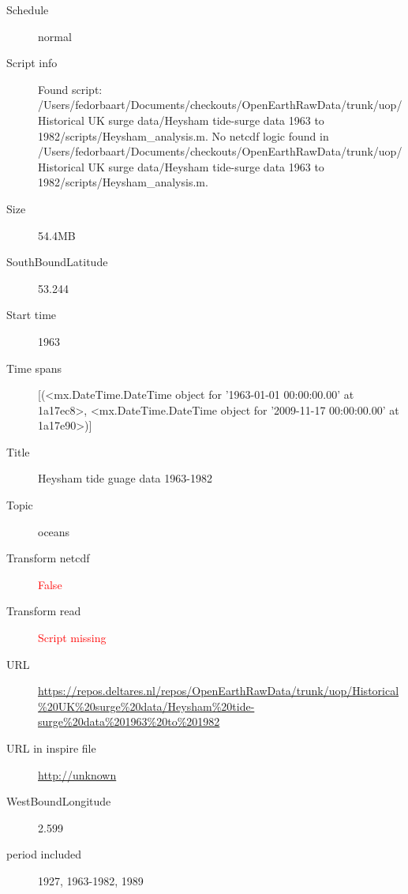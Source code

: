 \documentclass[9]{report}
\begin{document}
\begin{description}
\begin{verbatim}
\end{verbatim}
  \item[Schedule] normal
  \item[Script info] Found script: /Users/fedorbaart/Documents/checkouts/OpenEarthRawData/trunk/uop/Historical UK surge data/Heysham tide-surge data 1963 to 1982/scripts/Heysham\_analysis.m.
No netcdf logic found in /Users/fedorbaart/Documents/checkouts/OpenEarthRawData/trunk/uop/Historical UK surge data/Heysham tide-surge data 1963 to 1982/scripts/Heysham\_analysis.m.
  \item[Size] 54.4MB
  \item[SouthBoundLatitude] 53.244
  \item[Start time] 1963
  \item[Time spans] [(<mx.DateTime.DateTime object for '1963-01-01 00:00:00.00' at 1a17ec8>, <mx.DateTime.DateTime object for '2009-11-17 00:00:00.00' at 1a17e90>)]
  \item[Title]  Heysham tide guage data 1963-1982 
  \item[Topic] oceans
  \item[Transform netcdf] \textcolor{red}{False}
  \item[Transform read] \textcolor{red}{Script missing}
  \item[URL] \href{https://repos.deltares.nl/repos/OpenEarthRawData/trunk/uop/Historical\%20UK\%20surge\%20data/Heysham\%20tide-surge\%20data\%201963\%20to\%201982}{https://repos.deltares.nl/repos/OpenEarthRawData/trunk/uop/Historical\%20UK\%20surge\%20data/Heysham\%20tide-surge\%20data\%201963\%20to\%201982}
  \item[URL in inspire file] \href{http://unknown}{http://unknown}
  \item[WestBoundLongitude] 2.599
  \item[period included] 1927, 1963-1982, 1989
\end{description}
\end{document}
